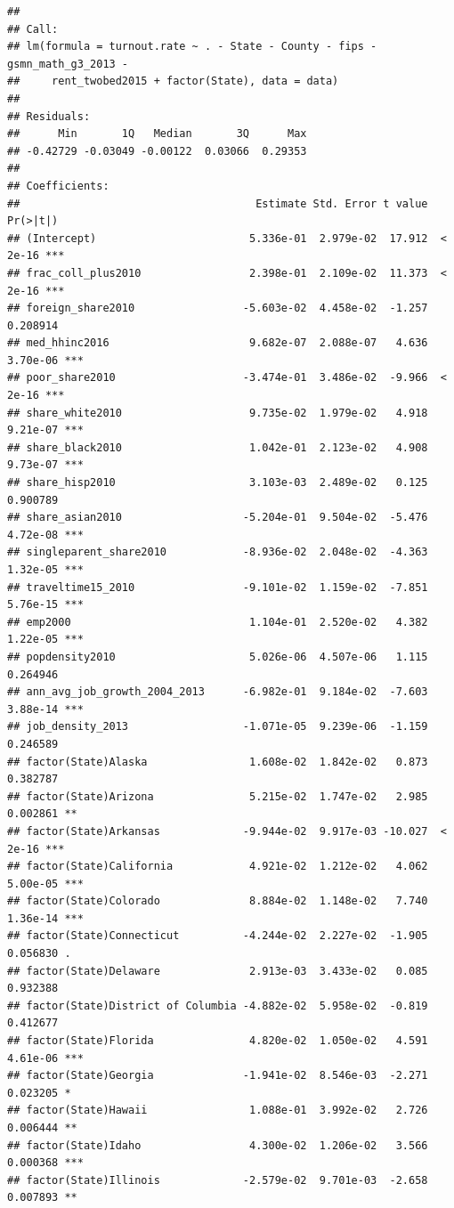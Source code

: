 \documentclass[
]{article}
\begin{document}
\begin{verbatim}
## 
## Call:
## lm(formula = turnout.rate ~ . - State - County - fips - gsmn_math_g3_2013 - 
##     rent_twobed2015 + factor(State), data = data)
## 
## Residuals:
##      Min       1Q   Median       3Q      Max 
## -0.42729 -0.03049 -0.00122  0.03066  0.29353 
## 
## Coefficients:
##                                     Estimate Std. Error t value Pr(>|t|)    
## (Intercept)                        5.336e-01  2.979e-02  17.912  < 2e-16 ***
## frac_coll_plus2010                 2.398e-01  2.109e-02  11.373  < 2e-16 ***
## foreign_share2010                 -5.603e-02  4.458e-02  -1.257 0.208914    
## med_hhinc2016                      9.682e-07  2.088e-07   4.636 3.70e-06 ***
## poor_share2010                    -3.474e-01  3.486e-02  -9.966  < 2e-16 ***
## share_white2010                    9.735e-02  1.979e-02   4.918 9.21e-07 ***
## share_black2010                    1.042e-01  2.123e-02   4.908 9.73e-07 ***
## share_hisp2010                     3.103e-03  2.489e-02   0.125 0.900789    
## share_asian2010                   -5.204e-01  9.504e-02  -5.476 4.72e-08 ***
## singleparent_share2010            -8.936e-02  2.048e-02  -4.363 1.32e-05 ***
## traveltime15_2010                 -9.101e-02  1.159e-02  -7.851 5.76e-15 ***
## emp2000                            1.104e-01  2.520e-02   4.382 1.22e-05 ***
## popdensity2010                     5.026e-06  4.507e-06   1.115 0.264946    
## ann_avg_job_growth_2004_2013      -6.982e-01  9.184e-02  -7.603 3.88e-14 ***
## job_density_2013                  -1.071e-05  9.239e-06  -1.159 0.246589    
## factor(State)Alaska                1.608e-02  1.842e-02   0.873 0.382787    
## factor(State)Arizona               5.215e-02  1.747e-02   2.985 0.002861 ** 
## factor(State)Arkansas             -9.944e-02  9.917e-03 -10.027  < 2e-16 ***
## factor(State)California            4.921e-02  1.212e-02   4.062 5.00e-05 ***
## factor(State)Colorado              8.884e-02  1.148e-02   7.740 1.36e-14 ***
## factor(State)Connecticut          -4.244e-02  2.227e-02  -1.905 0.056830 .  
## factor(State)Delaware              2.913e-03  3.433e-02   0.085 0.932388    
## factor(State)District of Columbia -4.882e-02  5.958e-02  -0.819 0.412677    
## factor(State)Florida               4.820e-02  1.050e-02   4.591 4.61e-06 ***
## factor(State)Georgia              -1.941e-02  8.546e-03  -2.271 0.023205 *  
## factor(State)Hawaii                1.088e-01  3.992e-02   2.726 0.006444 ** 
## factor(State)Idaho                 4.300e-02  1.206e-02   3.566 0.000368 ***
## factor(State)Illinois             -2.579e-02  9.701e-03  -2.658 0.007893 ** 

\end{verbatim}
\end{document}
